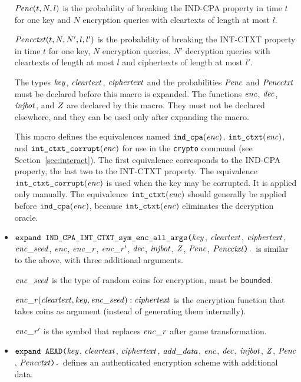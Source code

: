\documentclass{article}
\begin{document}
\begin{itemize}
  $\mathit{Penc}(t, N, l)$ is the probability of breaking the IND-CPA
  property in time $t$ for one key and $N$ encryption queries with
  cleartexts of length at most $l$.

  $\mathit{Pencctxt}(t, N, N', l, l')$ is the probability of breaking the
  INT-CTXT property in time $t$ for one key, $N$ encryption queries,
  $N'$ decryption queries with cleartexts of length at most $l$ and
  ciphertexts of length at most $l'$.

   The types $\mathit{key}$, $\mathit{cleartext}$,
   $\mathit{ciphertext}$ and the probabilities $\mathit{Penc}$ and $\mathit{Pencctxt}$ must
   be declared before this macro is expanded. The functions
   $\mathit{enc}$, $\mathit{dec}$, $\mathit{injbot}$, and $\mathit{Z}$ are declared by this
   macro. They must not be declared elsewhere, and they can be used
   only after expanding the macro.

   This macro defines the equivalences named $\texttt{ind\_cpa}(\mathit{enc})$,
   $\texttt{int\_ctxt}(\mathit{enc})$, and $\texttt{int\_ctxt\_corrupt}(\mathit{enc})$ 
   for use in the \texttt{crypto} command 
   (see Section~\ref{sec:interact}). 
   The first equivalence corresponds to the
   IND-CPA property, the last two to the INT-CTXT property.
   The equivalence $\texttt{int\_ctxt\_corrupt}(\mathit{enc})$ is used when the
   key may be corrupted. It is applied only manually.
   The equivalence $\texttt{int\_ctxt}(\mathit{enc})$
   should generally be applied before $\texttt{ind\_cpa}(\mathit{enc})$,
   because $\texttt{int\_ctxt}(\mathit{enc})$ eliminates the decryption oracle.

\item $\texttt{expand IND\_CPA\_INT\_CTXT\_sym\_enc\_all\_args(}\mathit{key}$,
$  \mathit{cleartext}$, $\mathit{ciphertext}$, $\mathit{enc\_seed}$, $\mathit{enc}$, $\mathit{enc\_r}$, $\mathit{enc\_r}'$,
$  \mathit{dec}$, $\mathit{injbot}$, $\mathit{Z}$, $\mathit{Penc}$, $\mathit{Pencctxt}\texttt{).}$  is similar to the above,
  with three additional arguments. 

  $\mathit{enc\_seed}$ is the type of random coins for encryption, must be \texttt{bounded}.

  $\mathit{enc\_r}(\mathit{cleartext}, \mathit{key}, \mathit{enc\_seed}): \mathit{ciphertext}$ is the encryption function that takes coins as argument (instead of generating them internally).

  $\mathit{enc\_r}'$ is the symbol that replaces $\mathit{enc\_r}$ after game transformation.

\item $\texttt{expand AEAD(}\mathit{key}$,
$  \mathit{cleartext}$, $\mathit{ciphertext}$, $\mathit{add\_data}$, $\mathit{enc}$,
$  \mathit{dec}$, $\mathit{injbot}$, $\mathit{Z}$, $\mathit{Penc}$, $\mathit{Pencctxt}\texttt{).}$ defines an
authenticated encryption scheme with additional data.


\end{itemize}
\end{document}
